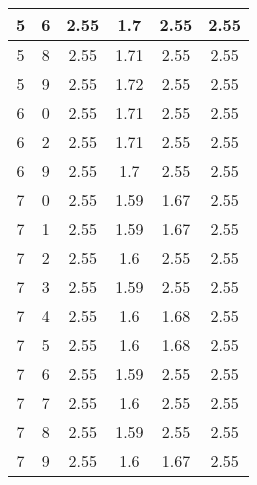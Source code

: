 \begin{longtable}{|c|c||c||c|c||c|}
	5 & 6 & 2.55 & 1.7 & 2.55 & 2.55 \\ \hline
	5 & 8 & 2.55 & 1.71 & 2.55 & 2.55 \\ \hline
	5 & 9 & 2.55 & 1.72 & 2.55 & 2.55 \\ \hline
	6 & 0 & 2.55 & 1.71 & 2.55 & 2.55 \\ \hline
	6 & 2 & 2.55 & 1.71 & 2.55 & 2.55 \\ \hline
	6 & 9 & 2.55 & 1.7 & 2.55 & 2.55 \\ \hline
	7 & 0 & 2.55 & 1.59 & 1.67 & 2.55 \\ \hline
	7 & 1 & 2.55 & 1.59 & 1.67 & 2.55 \\ \hline
	7 & 2 & 2.55 & 1.6 & 2.55 & 2.55 \\ \hline
	7 & 3 & 2.55 & 1.59 & 2.55 & 2.55 \\ \hline
	7 & 4 & 2.55 & 1.6 & 1.68 & 2.55 \\ \hline
	7 & 5 & 2.55 & 1.6 & 1.68 & 2.55 \\ \hline
	7 & 6 & 2.55 & 1.59 & 2.55 & 2.55 \\ \hline
	7 & 7 & 2.55 & 1.6 & 2.55 & 2.55 \\ \hline
	7 & 8 & 2.55 & 1.59 & 2.55 & 2.55 \\ \hline
	7 & 9 & 2.55 & 1.6 & 1.67 & 2.55 \\ \hline
\end{longtable}
\clearpage{}
